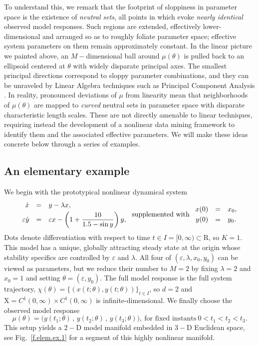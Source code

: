 \documentclass{article}
\newcommand{\eps}{\varepsilon}
\newcommand{\p}{\theta}
\newcommand{\fmr}{\chi}
\newcommand{\omr}{\mu}
\newcommand{\R}{\mathrm{R}}
\newcommand{\fms}{\mathrm{X}}
\newcommand{\be}{\begin{equation}}
\newcommand{\ee}{\end{equation}}
\begin{document}
To understand this, we remark that the footprint of sloppiness in parameter space is the existence of \emph{neutral sets}, all points in which evoke \emph{nearly identical} observed model responses.
Such regions are extended, effectively lower-dimensional and arranged so as to roughly foliate parameter space; effective system parameters on them remain approximately constant.
In the linear picture we painted above, an $M-$dimensional ball around $\omr(\p)$ is pulled back to an ellipsoid centered at $\p$ with widely disparate principal axes.
The smallest principal directions correspond to sloppy parameter combinations, and they can be unraveled by Linear Algebra techniques such as Principal Component Analysis \cite{ADS06}.
In reality, pronounced deviations of $\omr$ from linearity mean that neighborhoods of $\omr(\p)$ are mapped to \emph{curved} neutral sets in parameter space with disparate characteristic length scales.
These are not directly amenable to linear techniques, requiring instead the development of a nonlinear data mining framework to identify them and the associated effective parameters.
We will make these ideas concrete below through a series of examples.\\

\subsection{An elementary example}
\label{ss-elem.ex}
%
We begin with the prototypical nonlinear dynamical system
%
\be
\begin{array}{rcl}
 \dot{x} &=& y - \lambda x ,
\vspace*{1mm}\\
 \eps \dot{y} &=& \eps x - \displaystyle\left(1+\frac{10}{1.5-\sin y}\right) y ,
\end{array}
\ \mbox{supplemented with} \
\begin{array}{rcl}
 x(0) &=& x_0 ,
\vspace*{1mm}\\
 y(0) &=& y_0 .
\end{array}
\label{elem-ODE}
\ee
%
Dots denote differentiation with respect to time $t \in I = [0,\infty) \subset \R$, so $K=1$.
This model has a unique, globally attracting steady state at the origin
whose stability specifics are controlled by $\eps$ and $\lambda$.
All four of $(\eps,\lambda,x_0,y_0)$ can be viewed as parameters,
but we reduce their number to $M=2$ by fixing $\lambda= 2$ and $x_0 = 1$ and setting $\p = (\eps,y_0)$.
The full model response is the full system trajectory, $\fmr(\p) = \{(x(t;\p),y(t;\p))\}_{t \in I}$, so $d = 2$ and $\fms = C^1(0,\infty) \times C^1(0,\infty)$ is infinite-dimensional.
We finally choose the observed model response
%
\be
 \mu(\p) = \big( y(t_1;\p) \,,\, y(t_2;\p) \,,\, y(t_3;\p) \big) ,
\ \mbox{for fixed instants} \
 0 < t_1 < t_2 < t_3 .
\label{elem-mu}
\ee
%
This setup yields a $2-$D model manifold embedded in $3-$D Euclidean space, see Fig.~\ref{f.elem.ex.1} for a segment of this highly nonlinear manifold.\\
\end{document}
